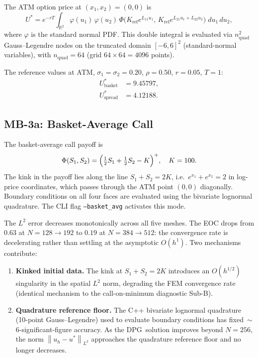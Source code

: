 \documentclass[11pt,a4paper]{article}
\newcommand{\dpg}{\textsc{DPG}}
\newcommand{\norm}[1]{\left\|#1\right\|}
\newcommand{\R}{\mathbb{R}}
\newcommand{\Kref}{K_{\mathrm{ref}}}
\newcommand{\ustar}{U^*}
\begin{document}
The ATM option price at $(x_1,x_2)=(0,0)$ is
\begin{equation}
  \ustar = e^{-rT} \int_{\R^2}
    \varphi(u_1)\,\varphi(u_2)\,
    \Phi\!\bigl(\Kref e^{L_{11}u_1},\, \Kref e^{L_{21}u_1+L_{22}u_2}\bigr)\;
    du_1\,du_2,
\end{equation}
where $\varphi$ is the standard normal PDF.
This double integral is evaluated via $n_\text{quad}^2$ Gauss--Legendre nodes
on the truncated domain $[-6,6]^2$ (standard-normal variables), with
$n_\text{quad}=64$ (grid $64\times 64 = 4096$ points).

The reference values at ATM, $\sigma_1=\sigma_2=0.20$, $\rho=0.50$, $r=0.05$, $T=1$:
\begin{align}
  \ustar_{\text{basket}} &= 9.45797, \label{eq:atm_basket}\\
  \ustar_{\text{spread}} &= 4.12188. \label{eq:atm_spread}
\end{align}

\subsection{MB-3a: Basket-Average Call}
\label{ssec:mb3a}

The basket-average call payoff is
\begin{equation}
  \Phi(S_1,S_2) = \Bigl(\tfrac{1}{2}S_1 + \tfrac{1}{2}S_2 - K\Bigr)^+, \quad K = 100.
\end{equation}
The kink in the payoff lies along the line $S_1+S_2 = 2K$, i.e.\
$e^{x_1}+e^{x_2}=2$ in log-price coordinates, which passes through the ATM
point $(0,0)$ diagonally.  Boundary conditions on all four faces are
evaluated using the bivariate lognormal quadrature.  The CLI flag
\texttt{--basket\_avg} activates this mode.

\tableBasketSpatialConvergence

The $L^2$ error decreases monotonically across all five meshes.  The EOC drops
from $0.63$ at $N=128\to192$ to $0.19$ at $N=384\to512$: the convergence rate
is decelerating rather than settling at the asymptotic $O(h^1)$.  Two mechanisms
contribute:
\begin{enumerate}
  \item \textbf{Kinked initial data.}  The kink at $S_1+S_2=2K$ introduces an
        $O(h^{1/2})$ singularity in the spatial $L^2$ norm, degrading the
        FEM convergence rate (identical mechanism to the call-on-minimum
        diagnostic Sub-B).
  \item \textbf{Quadrature reference floor.}  The C++ bivariate lognormal
        quadrature (10-point Gauss--Legendre) used to evaluate boundary
        conditions has fixed~$\sim$6-significant-figure accuracy.  As the
        \dpg\ solution improves beyond $N=256$, the norm $\norm{u_h-u^*}_{L^2}$
        approaches the quadrature reference floor and no longer decreases.
\end{enumerate}
\end{document}
